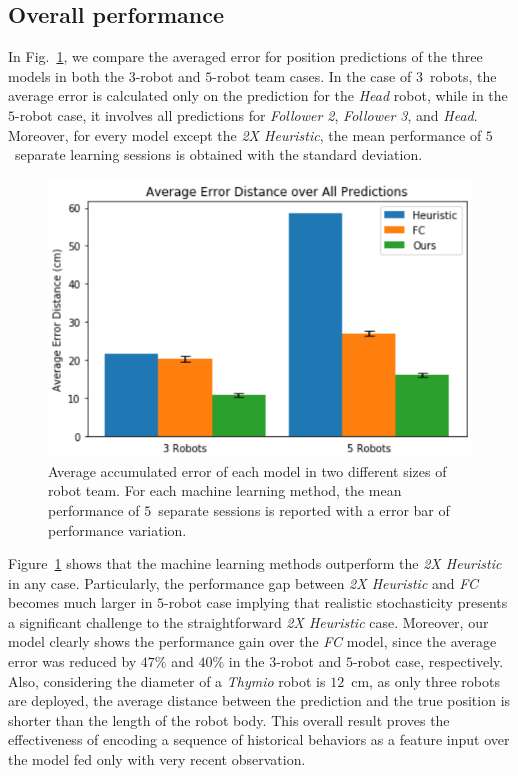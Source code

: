 \documentclass[letterpaper, 10 pt, conference]{ieeeconf}  %
\begin{document}
	\subsection{Overall performance}
	\label{sec:overall_performance}

    In Fig.~\ref{fig:macro_eval}, we compare the averaged error for
    position predictions of the three models in both the $3$-robot and
    $5$-robot team cases. In the case of $3$~robots, the average error
    is calculated only on the prediction for the \emph{Head} robot,
    while in the $5$-robot case, it involves all predictions for
    \emph{Follower 2}, \emph{Follower 3}, and \emph{Head}. Moreover, for
    every model except the \emph{2X Heuristic}, the mean performance of
    $5$~separate learning sessions is obtained with the standard
    deviation.
	\begin{figure}[t]
		\centering
		\includegraphics[width=1.\columnwidth]{fig_macro_eval}
		\caption{Average accumulated error of each model in two different sizes of robot team.
			For each machine learning method, the mean performance of $5$~separate sessions is reported with a error bar of performance variation.
		}
		\label{fig:macro_eval}
	\end{figure}
    Figure~\ref{fig:macro_eval} shows that the machine learning methods
    outperform the \emph{2X Heuristic} in any case. Particularly, the
    performance gap between \emph{2X Heuristic} and \emph{FC} becomes
    much larger in $5$-robot case implying that realistic
    stochasticity presents a significant challenge to the
    straightforward \emph{2X Heuristic} case. Moreover, our model
    clearly shows the performance gain over the \emph{FC} model,
    since the average error was reduced by $47\%$ and $40\%$ in the
    $3$-robot and $5$-robot case, respectively. Also, considering
    the diameter of a \emph{Thymio} robot is $12$~cm, as only three
    robots are deployed, the average distance between the prediction and
    the true position is shorter than the length of the robot body. This
    overall result proves the effectiveness of encoding a sequence of
    historical behaviors as a feature input over the model fed only with
    very recent observation.
       
\end{document}
